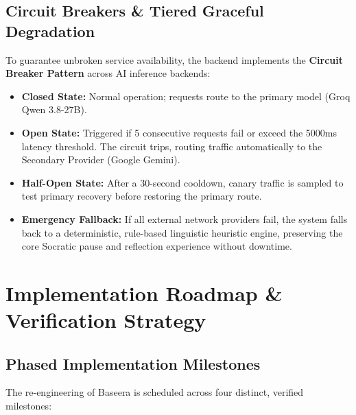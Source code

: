 \documentclass[11pt,a4paper]{report}
\begin{document}
\section{Circuit Breakers \& Tiered Graceful Degradation}
To guarantee unbroken service availability, the backend implements the \textbf{Circuit Breaker Pattern} across AI inference backends:
\begin{itemize}
    \item \textbf{Closed State:} Normal operation; requests route to the primary model (Groq Qwen 3.8-27B).
    \item \textbf{Open State:} Triggered if 5 consecutive requests fail or exceed the 5000ms latency threshold. The circuit trips, routing traffic automatically to the Secondary Provider (Google Gemini).
    \item \textbf{Half-Open State:} After a 30-second cooldown, canary traffic is sampled to test primary recovery before restoring the primary route.
    \item \textbf{Emergency Fallback:} If all external network providers fail, the system falls back to a deterministic, rule-based linguistic heuristic engine, preserving the core Socratic pause and reflection experience without downtime.
\end{itemize}

\chapter{Implementation Roadmap \& Verification Strategy}

\section{Phased Implementation Milestones}
The re-engineering of Baseera is scheduled across four distinct, verified milestones:
\end{document}
